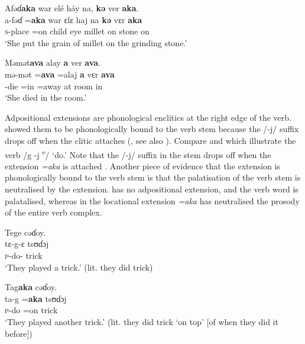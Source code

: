 \ea\label{ex:7:92}
Afəɗ\textbf{aka}  war  elé  háy  na,  \textbf{kə}  ver  \textbf{aka}.\\
\gll  a-fəɗ =\textbf{aka}  war  ɛlɛ  haj  na  \textbf{kə}  vɛr  \textbf{aka}\\
      \textsc{s}-place  =on  child  eye  millet  {\PSP}  on  stone  on\\
\glt  ‘She put the grain of millet on the grinding stone.’\\
\z 

\ea\label{ex:7:93}
Məmət\textbf{ava}  alay  \textbf{a}  ver  \textbf{ava}.\\
\gll  mə-mət =\textbf{ava} =alaj  \textbf{a}   vɛr   \textbf{ava}\\
      {\NOM}-die  =in  =away  at  room  in\\
\glt  ‘She died in the room.’\\
\z 

Adpositional extensions are phonological enclitics at the right edge of the verb.  \citet{FriesenMamalis2008} showed them to be phonologically bound to the verb stem because the /-j/ suffix drops off when the clitic attaches (, see also ). Compare  and  which illustrate the verb /g -j \textsuperscript{e}/ ‘do.’ Note that the /-j/ suffix in the stem drops off when the extension \textit{=aka} is attached . Another piece of evidence that the extension is phonologically bound to the verb stem is that the palatisation of the verb stem is neutralised by the extension.  has no adpositional extension, and the verb word is palatalised, whereas in  the locational extension\textit{ =aka }has neutralised the prosody of the entire verb complex.

\ea\label{ex:7:94}
Tege  cəɗoy.\\
\gll  tɛ-g-ɛ  tsʊɗɔj\\
      \textsc{p}-do-{\CL}  trick\\
\glt  ‘They played a trick.' (lit. they did trick)\\
\z 

\ea\label{ex:7:95}
Tag\textbf{aka}  cəɗoy.\\
\gll  ta-g   =\textbf{aka}   tsʊɗɔj\\
      \textsc{p}-do   =on   trick\\
\glt  ‘They played another trick.’ (lit. they did trick ‘on top’ [of when they did it before])\\
\z 

